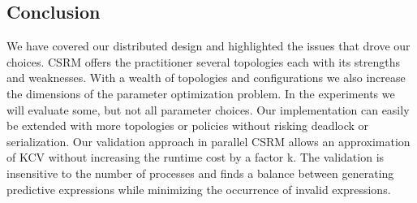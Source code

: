 \subsection{Conclusion}
We have covered our distributed design and highlighted the issues that drove our choices. CSRM offers the practitioner several topologies each with its strengths and weaknesses. 
With a wealth of topologies and configurations we also increase the dimensions of the parameter optimization problem. In the experiments we will evaluate some, but not all parameter choices. 
Our implementation can easily be extended with more topologies or policies without risking deadlock or serialization.
Our validation approach in parallel CSRM allows an approximation of KCV without increasing the runtime cost by a factor k. The validation is insensitive to the number of processes and finds a balance between generating predictive expressions while minimizing the occurrence of invalid expressions.